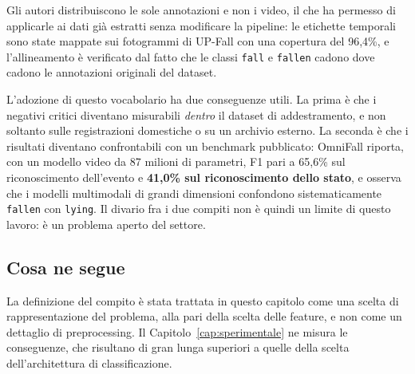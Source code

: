 Gli autori distribuiscono le sole annotazioni e non i video, il che ha permesso
di applicarle ai dati già estratti senza modificare la pipeline: le etichette
temporali sono state mappate sui fotogrammi di UP-Fall con una copertura del
96,4\%, e l'allineamento è verificato dal fatto che le classi \texttt{fall} e
\texttt{fallen} cadono dove cadono le annotazioni originali del dataset.

L'adozione di questo vocabolario ha due conseguenze utili. La prima è che i
negativi critici diventano misurabili \emph{dentro} il dataset di
addestramento, e non soltanto sulle registrazioni domestiche o su un archivio
esterno. La seconda è che i risultati diventano confrontabili con un benchmark
pubblicato: OmniFall riporta, con un modello video da 87 milioni di parametri,
F1 pari a 65,6\% sul riconoscimento dell'evento e \textbf{41,0\% sul
riconoscimento dello stato}, e osserva che i modelli multimodali di grandi
dimensioni confondono sistematicamente \texttt{fallen} con \texttt{lying}. Il
divario fra i due compiti non è quindi un limite di questo lavoro: è un
problema aperto del settore.

\subsection{Cosa ne segue}

La definizione del compito è stata trattata in questo capitolo come una scelta
di rappresentazione del problema, alla pari della scelta delle feature, e non
come un dettaglio di preprocessing. Il Capitolo~\ref{cap:sperimentale} ne misura
le conseguenze, che risultano di gran lunga superiori a quelle della scelta
dell'architettura di classificazione.
